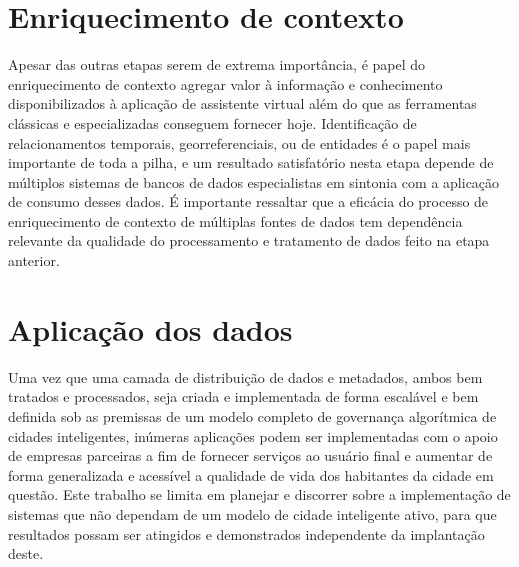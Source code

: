 \section{Enriquecimento de contexto} \label{s:enriquecimento_de_contexto}

Apesar das outras etapas serem de extrema importância, é papel do enriquecimento de contexto agregar valor à informação e conhecimento disponibilizados à aplicação de assistente virtual além do que as ferramentas clássicas e especializadas conseguem fornecer hoje. Identificação de relacionamentos temporais, georreferenciais, ou de entidades é o papel mais importante de toda a pilha, e um resultado satisfatório nesta etapa depende de múltiplos sistemas de bancos de dados especialistas em sintonia com a aplicação de consumo desses dados. É importante ressaltar que a eficácia do processo de enriquecimento de contexto de múltiplas fontes de dados tem dependência relevante da qualidade do processamento e tratamento de dados feito na etapa anterior.

\section{Aplicação dos dados} \label{s:aplicacao_dos_dados}

Uma vez que uma camada de distribuição de dados e metadados, ambos bem tratados e processados, seja criada e implementada de forma escalável e bem definida sob as premissas de um modelo completo de governança algorítmica de cidades inteligentes, inúmeras aplicações podem ser implementadas com o apoio de empresas parceiras a fim de fornecer serviços ao usuário final e aumentar de forma generalizada e acessível a qualidade de vida dos habitantes da cidade em questão. Este trabalho se limita em planejar e discorrer sobre a implementação de sistemas que não dependam de um modelo de cidade inteligente ativo, para que resultados possam ser atingidos e demonstrados independente da implantação deste.